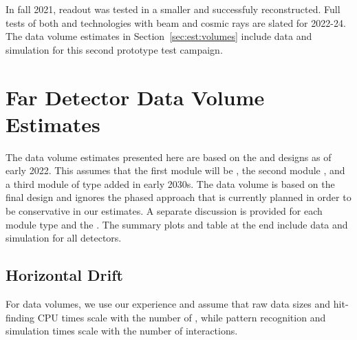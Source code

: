 \documentclass[../main-v1.tex]{subfiles}
\begin{document}
In fall 2021, %
 readout was tested in a smaller \coldbox and successfuly reconstructed. Full  tests of both  and  technologies with beam and cosmic rays are slated for 2022-24. The data volume estimates in Section~\ref{sec:est:volumes} include data and simulation for this second prototype test campaign. 







\section{Far Detector Data Volume Estimates }
\label{sec:est:FD}  

The data volume estimates presented here are based on the %
  and  designs as of %
early 2022. This assumes that the first module will be , the second module , and a third module of type  added in early 2030s. The  data volume is based on the final  design and ignores the phased approach that is currently planned in order to be conservative in our estimates. A separate discussion is provided for each  module type and the . The summary plots and table at the end include data and simulation for all detectors.

\subsection{Horizontal Drift}
For   data volumes, we use our  experience and assume that raw data sizes and hit-finding CPU times scale with the number of , while pattern recognition and simulation times scale with the number of interactions. 
\end{document}
